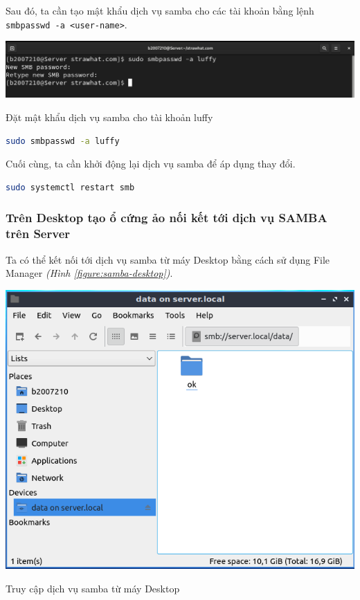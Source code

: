 \documentclass[a4paper, 11pt]{article}
\begin{document}
Sau đó, ta cần tạo mật khẩu dịch vụ samba cho các tài khoản bằng lệnh \texttt{smbpasswd -a <user-name>}.

\begin{minipage}
    {\linewidth}
    \captionsetup{type=figure}
    \centering
    \includegraphics[width=\linewidth]{images/smb-passwd-luffy.png}
    \caption{Đặt mật khẩu dịch vụ samba cho tài khoản luffy}
    \label{figure:smb-passwd-luffy}
\end{minipage}

\begin{lstlisting}[language=bash, caption={Đặt mật khẩu dịch vụ samba cho tài khoản luffy}]
sudo smbpasswd -a luffy
\end{lstlisting}

Cuối cùng, ta cần khởi động lại dịch vụ samba để áp dụng thay đổi.

\begin{lstlisting}[language=bash, caption={Khởi động lại dịch vụ samba}]
sudo systemctl restart smb
\end{lstlisting}

\subsubsection{Trên Desktop tạo ổ cứng ảo nối kết tới dịch vụ SAMBA trên Server}

Ta có thể kết nối tới dịch vụ samba từ máy Desktop bằng cách sử dụng File Manager \textit{(Hình \ref{figure:samba-desktop})}.

\begin{minipage}
    {\linewidth}
    \captionsetup{type=figure}
    \centering
    \includegraphics[width=\linewidth]{images/samba-desktop.png}
    \caption{Truy cập dịch vụ samba từ máy Desktop}
    \label{figure:samba-desktop}
\end{minipage}
\end{document}
